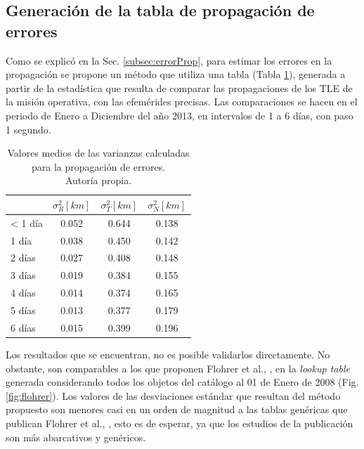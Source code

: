 \subsection*{Generaci\'on de la tabla de propagaci\'on de errores}

Como se explic\'o en la Sec. \ref{subsec:errorProp}, para estimar los errores en la propagaci\'on se propone un m\'etodo que utiliza una tabla (Tabla \ref{tab:resultatabla}), generada a partir de la estad\'istica que resulta de comparar las propagaciones de los TLE de la misi\'on operativa, con las efem\'erides precisas. Las comparaciones se hacen en el periodo de Enero a Diciembre del a\~no 2013, en intervalos de 1 a 6 d\'ias, con paso 1 segundo.

\begin{table}[!h]
\caption[Tabla con los valores medios para la propagaci\'on de errores.]{Valores medios de las varianzas calculadas\\ para la propagaci\'on de errores.\\ Autor\'ia propia.}
\begin{tabular}{lccc}
\hline \hline
\rowcolor{yellow!35}
&$\sigma^{2}_R [km]$ &$\sigma^{2}_T [km]$ &$\sigma^{2}_N [km]$\\
\hline \hline
< 1 d\'ia & 0.052& 0.644& 0.138\\
\hline
1 d\'ia & 0.038& 0.450& 0.142\\
\hline
2 d\'ias & 0.027& 0.408& 0.148\\
\hline
3 d\'ias & 0.019& 0.384& 0.155\\
\hline
4 d\'ias & 0.014& 0.374& 0.165\\
\hline
5 d\'ias & 0.013& 0.377& 0.179\\
\hline
6 d\'ias & 0.015& 0.399& 0.196\\
\hline
\end{tabular}
\label{tab:resultatabla}
\end{table}

Los resultados que se encuentran, no es posible validarlos directamente. No obstante, son comparables a los que proponen Flohrer et al., \citep{flohrer2008assessment}, en la {\it{lookup table}} generada considerando todos los objetos del cat\'alogo al 01 de Enero de 2008 (Fig.  \ref{fig:flohrer}). Los valores de las desviaciones est\'andar que resultan del m\'etodo propuesto son menores casi en un orden de magnitud a las tablas gen\'ericas que publican Flohrer et al., \citep{flohrer2008assessment}, esto es de esperar, ya que los estudios de la publicaci\'on son m\'as abarcativos y gen\'ericos.

